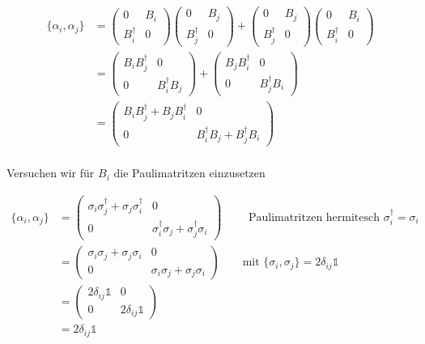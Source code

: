 \begin{align}
  \label{eq:18}
  \{\alpha_i,\alpha_j\}&=\begin{pmatrix}0&B_i\\ B^\dagger_i&0\end{pmatrix}\begin{pmatrix}0&B_j\\ B^\dagger_j&0\end{pmatrix} + \begin{pmatrix}0&B_j\\ B^\dagger_j&0\end{pmatrix}\begin{pmatrix}0&B_i\\ B^\dagger_i&0\end{pmatrix}\\
&=  \begin{pmatrix}B_iB_j^\dagger&0\\ 0&B^\dagger_iB_j\end{pmatrix}+\begin{pmatrix}B_j B_i^\dagger &0\\ 0&B^\dagger_j B_i\end{pmatrix}   \\  
&=  \begin{pmatrix}B_iB_j^\dagger +B_j B_i^\dagger &0\\ 0&B^\dagger_iB_j+B^\dagger_j B_i\end{pmatrix}\\
\end{align}

Versuchen wir für \(B_i\) die Paulimatritzen einzusetzen


\begin{align}
  \label{eq:19}
  \{\alpha_i,\alpha_j\} &= \begin{pmatrix}\sigma_i\sigma_j^\dagger +\sigma_j \sigma_i^\dagger &0\\ 0&\sigma^\dagger_i\sigma_j+\sigma^\dagger_j \sigma_i\end{pmatrix} \qquad \text{ Paulimatritzen hermitesch } \sigma_i^\dagger = \sigma_i \\
&= \begin{pmatrix}\sigma_i\sigma_j +\sigma_j \sigma_i &0\\ 0&\sigma_i\sigma_j+\sigma_j \sigma_i\end{pmatrix} \qquad \text{mit } \{\sigma_i,\sigma_j\}=2\delta_{ij}\mathds 1 \\ 
&=  \begin{pmatrix}2\delta_{ij}\mathds 1 &0\\ 0&2\delta_{ij}\mathds 1 \end{pmatrix}\\
&=2\delta_{ij}\mathds 1
\end{align}

